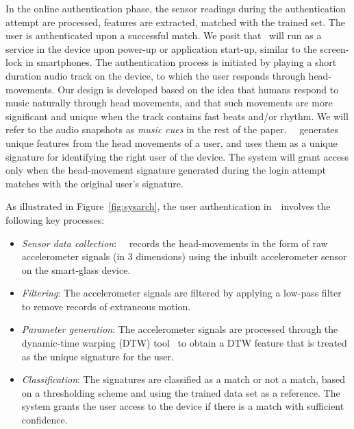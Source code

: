In the online authentication phase, the sensor readings during the 
authentication attempt are processed, features are extracted, matched with the 
trained set. The user is authenticated upon a successful match.
We posit that \systemname~will run as a service in the device upon power-up or application start-up, 
similar to the screen-lock in smartphones.  The authentication process is initiated
by playing a short duration audio track on the device, to which the user 
responds through head-movements. 
Our design is developed based on the idea that humans respond to music 
naturally through head movements, and that such movements are more
significant and unique when the track contains fast beats and/or rhythm.
We will refer to the audio snapshots as {\em music cues} in the rest of the 
paper. 
~\systemname~generates unique features from the head
movements of a user, and uses them as a unique signature for
identifying the right user of the device. The system will
grant access only when the head-movement signature
generated during the login attempt matches with the
original user's signature.

As illustrated in Figure~\ref{fig:sysarch}, the user 
authentication in~\systemname~involves the following key processes:
\begin{itemize}

\vspace{-2pt}\item {\em Sensor data collection}: ~\systemname~records the head-movements
in the form of raw accelerometer signals (in 3 dimensions) using the inbuilt 
accelerometer
sensor on the smart-glass device.
\vspace{-2pt}\item {\em Filtering}: The accelerometer signals are filtered by applying  
a low-pass filter to remove records of extraneous motion.
\vspace{-2pt}\item {\em Parameter generation}: The accelerometer signals are
processed through the dynamic-time warping (DTW) tool~\cite{dtw} to obtain a
DTW feature that is treated as the unique signature for the user.
\vspace{-2pt}\item {\em Classification}: The signatures are classified as 
a match or not a match, based on a thresholding 
scheme and using the trained data set as a reference. The system grants the 
user access to the device if there is a match 
with sufficient confidence.
\end{itemize}

